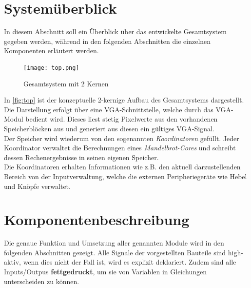\documentclass[a4paper,12pt,onesided]{report}
\begin{document}
\section{Systemüberblick}
\label{sec:überblick}
In diesem Abschnitt soll ein Überblick über das entwickelte Gesamtsystem gegeben werden, während in den folgenden Abschnitten die einzelnen Komponenten erläutert werden.

\begin{figure}[H]
	\centering
	\texttt{[image: top.png]}
	\caption{Gesamtsystem mit 2 Kernen}
	\label{fig:top}
\end{figure}

In \autoref{fig:top} ist der konzeptuelle 2-kernige Aufbau des Gesamtsystems dargestellt.\\
Die Darstellung erfolgt über eine VGA-Schnittstelle, welche durch das VGA-Modul bedient wird.
Dieses liest stetig Pixelwerte aus den vorhandenen Speicherblöcken aus und generiert aus diesen ein gültiges VGA-Signal.\\
Der Speicher wird wiederum von den sogenannten \textit{Koordinatoren} gefüllt.
Jeder Koordinator verwaltet die Berechnungen eines \textit{Mandelbrot-Cores} und schreibt dessen Rechenergebnisse in seinen eigenen Speicher.\\
Die Koordinatoren erhalten Informationen wie z.B. den aktuell darzustellenden Bereich von der Inputverwaltung, welche die externen Peripheriegeräte wie Hebel und Knöpfe verwaltet.\\

\section{Komponentenbeschreibung}
Die genaue Funktion und Umsetzung aller genannten Module wird in den folgenden Abschnitten gezeigt.
Alle Signale der vorgestellten Bauteile sind high-aktiv,
wenn dies nicht der Fall ist, wird es explizit deklariert.
Zudem sind alle Inputs/Outpus \textbf{fettgedruckt}, um sie von Variablen in Gleichungen unterscheiden zu können.
\end{document}
